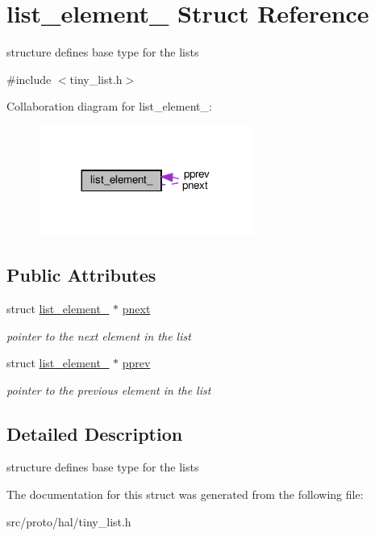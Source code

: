 \hypertarget{structlist__element__}{}\section{list\+\_\+element\+\_\+ Struct Reference}
\label{structlist__element__}


structure defines base type for the lists  




{\ttfamily \#include $<$tiny\+\_\+list.\+h$>$}



Collaboration diagram for list\+\_\+element\+\_\+\+:\nopagebreak
\begin{figure}[H]
\begin{center}
\leavevmode
\includegraphics[width=200pt]{structlist__element____coll__graph}
\end{center}
\end{figure}
\subsection*{Public Attributes}
\begin{DoxyCompactItemize}
\item 
\mbox{\label{structlist__element___a81cb2c54606be8120460bded0d919039}} 
struct \hyperlink{structlist__element__}{list\+\_\+element\+\_\+} $\ast$ \hyperlink{structlist__element___a81cb2c54606be8120460bded0d919039}{pnext}
\begin{DoxyCompactList}\small\item\em pointer to the next element in the list \end{DoxyCompactList}\item 
\mbox{\label{structlist__element___a0f6c573966c9d70d4a2ef19b73717515}} 
struct \hyperlink{structlist__element__}{list\+\_\+element\+\_\+} $\ast$ \hyperlink{structlist__element___a0f6c573966c9d70d4a2ef19b73717515}{pprev}
\begin{DoxyCompactList}\small\item\em pointer to the previous element in the list \end{DoxyCompactList}\end{DoxyCompactItemize}


\subsection{Detailed Description}
structure defines base type for the lists 

The documentation for this struct was generated from the following file\+:\begin{DoxyCompactItemize}
\item 
src/proto/hal/tiny\+\_\+list.\+h\end{DoxyCompactItemize}
